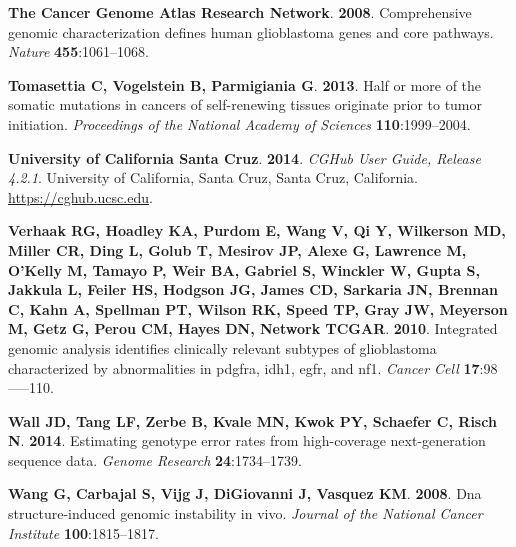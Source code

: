 \documentclass[11 pt]{article} %
\begin{document}
\begin{thebibliography}{31}
\textbf{{The Cancer Genome Atlas Research Network}}. \textbf{2008}.
\newblock Comprehensive genomic characterization defines human glioblastoma
  genes and core pathways.
\newblock \emph{Nature} \textbf{455}:1061--1068.

\textbf{Tomasettia C, Vogelstein B, Parmigiania G}. \textbf{2013}.
\newblock Half or more of the somatic mutations in cancers of self-renewing
  tissues originate prior to tumor initiation.
\newblock \emph{Proceedings of the National Academy of Sciences}
  \textbf{110}:1999--2004.

\textbf{{University of California Santa Cruz}}. \textbf{2014}.
\newblock \emph{{CGHub User Guide, Release 4.2.1}}.
\newblock University of California, Santa Cruz, Santa Cruz, California.
\newblock \urlprefix\url{https://cghub.ucsc.edu}.

\textbf{Verhaak RG, Hoadley KA, Purdom E, Wang V, Qi Y, Wilkerson MD, Miller
  CR, Ding L, Golub T, Mesirov JP, Alexe G, Lawrence M, O'Kelly M, Tamayo P,
  Weir BA, Gabriel S, Winckler W, Gupta S, Jakkula L, Feiler HS, Hodgson JG,
  James CD, Sarkaria JN, Brennan C, Kahn A, Spellman PT, Wilson RK, Speed TP,
  Gray JW, Meyerson M, Getz G, Perou CM, Hayes DN, Network TCGAR}.
  \textbf{2010}.
\newblock Integrated genomic analysis identifies clinically relevant subtypes
  of glioblastoma characterized by abnormalities in pdgfra, idh1, egfr, and
  nf1.
\newblock \emph{Cancer Cell} \textbf{17}:98—--110.

\textbf{Wall JD, Tang LF, Zerbe B, Kvale MN, Kwok PY, Schaefer C, Risch N}.
  \textbf{2014}.
\newblock Estimating genotype error rates from high-coverage next-generation
  sequence data.
\newblock \emph{Genome Research} \textbf{24}:1734--1739.

\textbf{Wang G, Carbajal S, Vijg J, DiGiovanni J, Vasquez KM}. \textbf{2008}.
\newblock Dna structure-induced genomic instability in vivo.
\newblock \emph{Journal of the National Cancer Institute}
  \textbf{100}:1815--1817.


\end{thebibliography}
\end{document}
